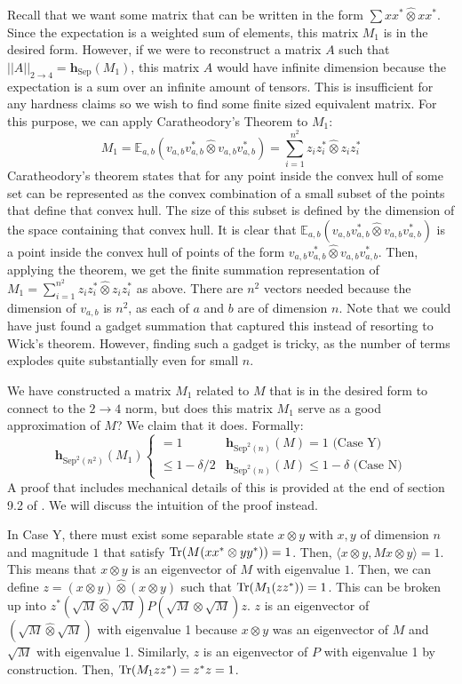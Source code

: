 \documentclass[10pt]{article}
\newcommand{\Sep}{\textrm{Sep}}
\newcommand{\mbf}[1]{\mathbf{ #1 }}
\begin{document}
Recall that we want some matrix that can be written in the form $\sum xx^* \hat{\otimes} xx^*$. Since the expectation is a weighted sum of elements, this matrix $M_1$ is in the desired form. However, if we were to reconstruct a matrix $A$ such that $||A||_{2 \to 4} = \mbf{h}_{\Sep}(M_1)$, this matrix $A$ would have infinite dimension because the expectation is a sum over an infinite amount of tensors. This is insufficient for any hardness claims so we wish to find some finite sized equivalent matrix. For this purpose, we can apply Caratheodory's Theorem to $M_1$:
$$M_1 = \mathbb{E}_{a,b}(v_{a,b} v_{a,b}^* \hat{\otimes} v_{a,b} v_{a,b}^*) = \sum_{i=1}^{n^2} z_iz_i^* \hat{\otimes} z_iz_i^*$$
Caratheodory's theorem states that for any point inside the convex hull of some set can be represented as the convex combination of a small subset of the points that define that convex hull. The size of this subset is defined by the dimension of the space containing that convex hull. It is clear that 
$\mathbb{E}_{a,b}(v_{a,b} v_{a,b}^* \hat{\otimes} v_{a,b} v_{a,b}^*)$ is a point inside the convex hull of points of the form $v_{a,b} v_{a,b}^* \hat{\otimes} v_{a,b} v_{a,b}^*$. Then, applying the theorem, we get the finite summation representation of $M_1 = \sum_{i=1}^{n^2} z_iz_i^* \hat{\otimes} z_iz_i^*$ as above. There are $n^2$ vectors needed because the dimension of $v_{a,b}$ is $n^2$, as each of $a$ and $b$ are of dimension $n$. Note that we could have just found a gadget summation that captured this instead of resorting to Wick's theorem. However, finding such a gadget is tricky, as the number of terms explodes quite substantially even for small $n$.

We have constructed a matrix $M_1$ related to $M$ that is in the desired form to connect to the $2 \to 4$ norm, but does this matrix $M_1$ serve as a good approximation of $M$? We claim that it does. Formally:
$$\mbf{h}_{\Sep^2(n^2)}(M_1) 
\begin{cases} 
   = 1 & \mbf{h}_{\Sep^2(n)}(M) = 1 \text{ (Case Y)}\\
   \leq 1 - \delta/2 & \mbf{h}_{\Sep^2(n)}(M) \leq 1-\delta \text{ (Case N)}
\end{cases}$$
A proof that includes mechanical details of this is provided at the end of section 9.2 of \cite{Barak}. We will discuss the intuition of the proof instead.

In Case Y, there must exist some separable state $x \otimes y$ with $x,y$ of dimension $n$ and magnitude $1$ that satisfy $\Tr(M(xx^* \otimes yy^*)) = 1$. Then, $\langle x \otimes y, M x \otimes y \rangle = 1$. This means that $x \otimes y$ is an eigenvector of $M$ with eigenvalue $1$. Then, we can define $z = (x \otimes y) \hat{\otimes} (x \otimes y)$ such that $\Tr(M_1 (zz^*)) = 1$. This can be broken up into $z^* (\sqrt{M} \hat{\otimes} \sqrt{M})P (\sqrt{M} \hat{\otimes} \sqrt{M}) z$. $z$ is an eigenvector of $(\sqrt{M} \hat{\otimes} \sqrt{M})$ with eigenvalue 1 because $x \otimes y$ was an eigenvector of $M$ and $\sqrt{M}$ with eigenvalue 1. Similarly, $z$ is an eigenvector of $P$ with eigenvalue 1 by construction. Then, $\Tr(M_1zz^*) = z^*z = 1$.
\end{document}
